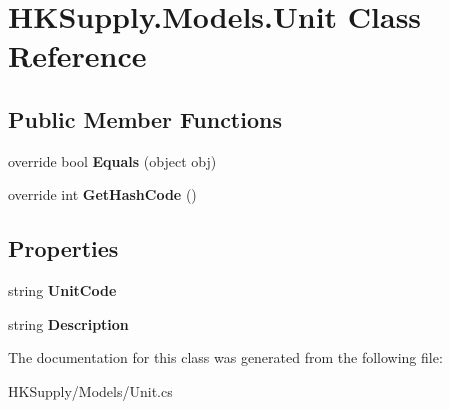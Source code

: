 \hypertarget{class_h_k_supply_1_1_models_1_1_unit}{}\section{H\+K\+Supply.\+Models.\+Unit Class Reference}
\label{class_h_k_supply_1_1_models_1_1_unit}
\subsection*{Public Member Functions}
\begin{DoxyCompactItemize}
\item 
\mbox{\label{class_h_k_supply_1_1_models_1_1_unit_a87b23bddb1d11e7d591a21c8b5bea340}} 
override bool {\bfseries Equals} (object obj)
\item 
\mbox{\label{class_h_k_supply_1_1_models_1_1_unit_a14950cf720a8f15e663853855a08911c}} 
override int {\bfseries Get\+Hash\+Code} ()
\end{DoxyCompactItemize}
\subsection*{Properties}
\begin{DoxyCompactItemize}
\item 
\mbox{\label{class_h_k_supply_1_1_models_1_1_unit_a81e0f2d96d128aa381a4670eb434770b}} 
string {\bfseries Unit\+Code}
\item 
\mbox{\label{class_h_k_supply_1_1_models_1_1_unit_aec7b3e595f7b20a575286c7de0f13f61}} 
string {\bfseries Description}
\end{DoxyCompactItemize}


The documentation for this class was generated from the following file\+:\begin{DoxyCompactItemize}
\item 
H\+K\+Supply/\+Models/Unit.\+cs\end{DoxyCompactItemize}
